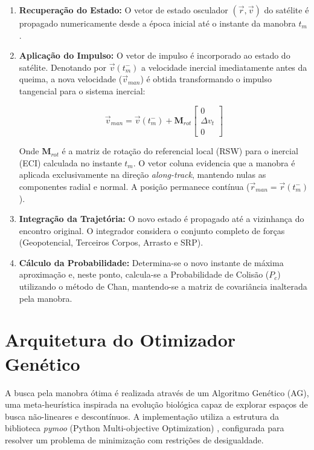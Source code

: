 \begin{enumerate}
    \item \textbf{Recuperação do Estado:} O vetor de estado osculador $(\vec{r}, \vec{v})$ do satélite é propagado numericamente desde a época inicial até o instante da manobra $t_m$.

    \item \textbf{Aplicação do Impulso:} O vetor de impulso é incorporado ao estado do satélite. Denotando por $\vec{v}(t_m^-)$ a velocidade inercial imediatamente antes da queima, a nova velocidade ($\vec{v}_{man}$) é obtida transformando o impulso tangencial para o sistema inercial:

    \begin{equation}
        \vec{v}_{man} = \vec{v}(t_m^-) + \mathbf{M}_{rot}
        \begin{bmatrix}
           0 \\
           \Delta v_t \\
           0
        \end{bmatrix}
    \end{equation}

    Onde $\mathbf{M}_{rot}$ é a matriz de rotação do referencial local (RSW) para o inercial (ECI) calculada no instante $t_m$. O vetor coluna evidencia que a manobra é aplicada exclusivamente na direção \textit{along-track}, mantendo nulas as componentes radial e normal. A posição permanece contínua ($\vec{r}_{man} = \vec{r}(t_m^-)$).

    \item \textbf{Integração da Trajetória:} O novo estado é propagado até a vizinhança do encontro original. O integrador considera o conjunto completo de forças (Geopotencial, Terceiros Corpos, Arrasto e SRP).

    \item \textbf{Cálculo da Probabilidade:} Determina-se o novo instante de máxima aproximação e, neste ponto, calcula-se a Probabilidade de Colisão ($P_c$) utilizando o método de Chan, mantendo-se a matriz de covariância inalterada pela manobra.
\end{enumerate}

\section{Arquitetura do Otimizador Genético}
\label{sec:genetic_algorithm}

A busca pela manobra ótima é realizada através de um Algoritmo Genético (AG), uma meta-heurística inspirada na evolução biológica capaz de explorar espaços de busca não-lineares e descontínuos. A implementação utiliza a estrutura da biblioteca \textit{pymoo} (Python Multi-objective Optimization) \cite{pymoo}, configurada para resolver um problema de minimização com restrições de desigualdade.


